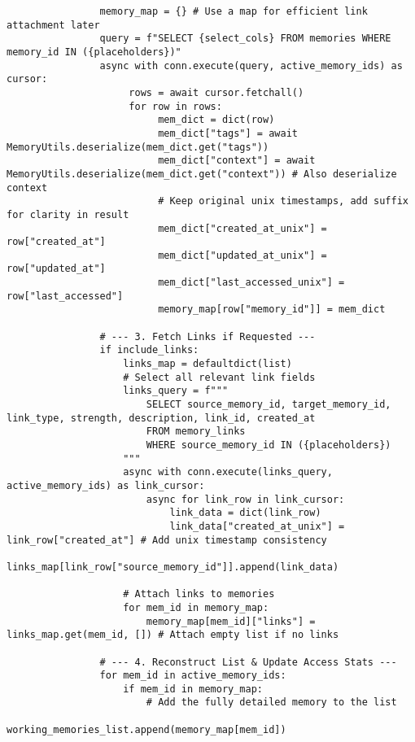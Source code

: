 \documentclass[12pt,a4paper]{article}
\begin{document}
\begin{pageablecode}
\begin{verbatim}
                memory_map = {} # Use a map for efficient link attachment later
                query = f"SELECT {select_cols} FROM memories WHERE memory_id IN ({placeholders})"
                async with conn.execute(query, active_memory_ids) as cursor:
                     rows = await cursor.fetchall()
                     for row in rows:
                          mem_dict = dict(row)
                          mem_dict["tags"] = await MemoryUtils.deserialize(mem_dict.get("tags"))
                          mem_dict["context"] = await MemoryUtils.deserialize(mem_dict.get("context")) # Also deserialize context
                          # Keep original unix timestamps, add suffix for clarity in result
                          mem_dict["created_at_unix"] = row["created_at"]
                          mem_dict["updated_at_unix"] = row["updated_at"]
                          mem_dict["last_accessed_unix"] = row["last_accessed"]
                          memory_map[row["memory_id"]] = mem_dict

                # --- 3. Fetch Links if Requested ---
                if include_links:
                    links_map = defaultdict(list)
                    # Select all relevant link fields
                    links_query = f"""
                        SELECT source_memory_id, target_memory_id, link_type, strength, description, link_id, created_at
                        FROM memory_links
                        WHERE source_memory_id IN ({placeholders})
                    """
                    async with conn.execute(links_query, active_memory_ids) as link_cursor:
                        async for link_row in link_cursor:
                            link_data = dict(link_row)
                            link_data["created_at_unix"] = link_row["created_at"] # Add unix timestamp consistency
                            links_map[link_row["source_memory_id"]].append(link_data)

                    # Attach links to memories
                    for mem_id in memory_map:
                        memory_map[mem_id]["links"] = links_map.get(mem_id, []) # Attach empty list if no links

                # --- 4. Reconstruct List & Update Access Stats ---
                for mem_id in active_memory_ids:
                    if mem_id in memory_map:
                        # Add the fully detailed memory to the list
                        working_memories_list.append(memory_map[mem_id])


\end{verbatim}
\end{pageablecode}
\end{document}

